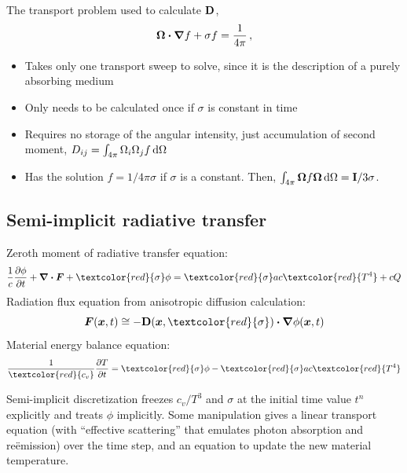 \documentclass{beamer}
\newcommand{\Dtens}{\mat{D}}
\begin{document}
\begin{frame}
  The transport problem used to calculate $\Dtens$,
  \begin{equation*}
    \bm{\Omega}\bm{\cdot} \bm{\nabla} f + \sigma f = \frac{1}{4\pi} \,,
  \end{equation*}
  \vspace{-\baselineskip}
  \begin{itemize}
    \item Takes only one transport sweep to solve, since it is the description
      of a purely absorbing medium
    \item Only needs to be calculated once if $\sigma$ is constant in time
    \item Requires no storage of the angular intensity, just accumulation of
      second
      moment, $D_{ij} = \int_{4\pi} \Omega_i \Omega_j f \mathop{}\!\mathrm{d} \Omega$
    \item Has the solution $f=1/4\pi\sigma$ if $\sigma$ is a constant.
      Then, $\int_{4\pi} \bm{\Omega} f \bm{\Omega} \mathop{}\!\mathrm{d} \Omega =
      \mathbf{I}/3\sigma$.
  \end{itemize}
\end{frame}

\subsection{Semi-implicit radiative transfer}
\begin{frame}
Zeroth moment of radiative transfer equation:
\begin{equation*}
  \frac{1}{c} \pder{\phi}{t}
  + \del \vd \vec{F} + \textcolor{red}{\sigma} \phi
  = \textcolor{red}{\sigma} ac\textcolor{red}{T^4}
  + c Q
\end{equation*}
Radiation flux equation from anisotropic diffusion calculation:
\begin{equation*}
 \vec{F}(\vec{x}, t) \cong - \Dtens(\vec{x},\textcolor{red}{\sigma})
  \vd \del \phi(\vec{x}, t)
\end{equation*}
Material energy balance equation:
\begin{equation*}
  \frac{1}{\textcolor{red}{c_v}}\pder{T}{t} = \textcolor{red}{\sigma} \phi -
  \textcolor{red}{\sigma} ac\textcolor{red}{T^4}
\end{equation*}

Semi-implicit discretization freezes $c_v/T^3$ and $\sigma$ at the initial time
value $t^n$ explicitly and treats $\phi$ implicitly. Some
manipulation gives a linear transport equation (with ``effective scattering''
that emulates photon absorption and re\"emission) over the time step, and an
equation to update the new material temperature.
\end{frame}
\end{document}

